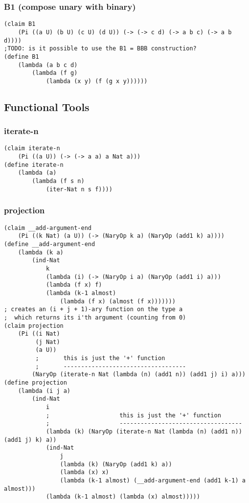 \subsubsection{B1 (compose unary with binary)} \label{code:B1}
\begin{lstlisting}
(claim B1
    (Pi ((a U) (b U) (c U) (d U)) (-> (-> c d) (-> a b c) (-> a b d))))
;TODO: is it possible to use the B1 = BBB construction?
(define B1
    (lambda (a b c d)
        (lambda (f g)
            (lambda (x y) (f (g x y))))))
\end{lstlisting}


\subsection{Functional Tools}

\subsubsection{iterate-n} \label{code:iterate-n}
\begin{lstlisting}
(claim iterate-n
    (Pi ((a U)) (-> (-> a a) a Nat a)))
(define iterate-n
    (lambda (a)
        (lambda (f s n)
            (iter-Nat n s f))))
\end{lstlisting}

\subsubsection{projection} \label{code:projection}
\begin{lstlisting}
(claim __add-argument-end
    (Pi ((k Nat) (a U)) (-> (NaryOp k a) (NaryOp (add1 k) a))))
(define __add-argument-end
    (lambda (k a)
        (ind-Nat
            k
            (lambda (i) (-> (NaryOp i a) (NaryOp (add1 i) a)))
            (lambda (f x) f)
            (lambda (k-1 almost) 
                (lambda (f x) (almost (f x)))))))
; creates an (i + j + 1)-ary function on the type a 
;  which returns its i'th argument (counting from 0)
(claim projection
    (Pi ((i Nat)
         (j Nat)
         (a U))
         ;       this is just the '+' function
         ;       -----------------------------------
        (NaryOp (iterate-n Nat (lambda (n) (add1 n)) (add1 j) i) a)))
(define projection
    (lambda (i j a)
        (ind-Nat
            i
            ;                    this is just the '+' function
            ;                    -----------------------------------
            (lambda (k) (NaryOp (iterate-n Nat (lambda (n) (add1 n)) (add1 j) k) a))
            (ind-Nat
                j
                (lambda (k) (NaryOp (add1 k) a))
                (lambda (x) x)
                (lambda (k-1 almost) (__add-argument-end (add1 k-1) a almost)))
            (lambda (k-1 almost) (lambda (x) almost)))))
\end{lstlisting}

